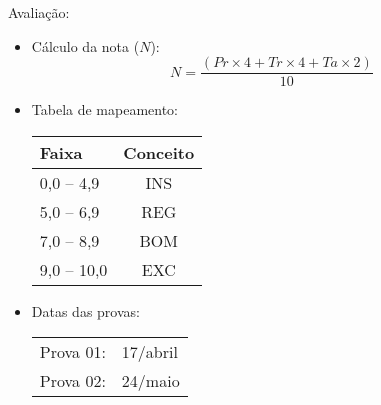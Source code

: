       \begin{slide}[toc=]{Avaliação:}
         \begin{itemize}
        \item Cálculo da nota ($N$):
            \begin{equation*}
	    N=\frac{( Pr \times 4 + Tr \times 4 + Ta \times 2 )} {10}
            \end{equation*}
          \item Tabela de mapeamento:
            \begin{table}
               \centering
               \begin{tabular}{lc}
                  \hline
                  \textbf{Faixa} & \textbf{Conceito}\\
                  \hline
                  0,0 -- 4,9 & INS\\
                  5,0 -- 6,9 & REG\\
                  7,0 -- 8,9 & BOM\\
                  9,0 -- 10,0 & EXC\\
                  \hline
               \end{tabular}
            \end{table}
      \item Datas das provas:
            \begin{table}
               \centering
               \begin{tabular}{|l l|}
                  \hline
                  Prova 01: & 17/abril\\
                  Prova 02: & 24/maio\\
                  \hline
               \end{tabular}
            \end{table}
         \end{itemize}
      \end{slide}

